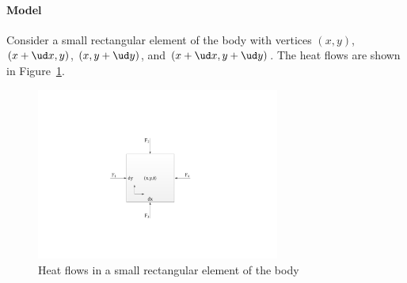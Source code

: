 \paragraph{Model}
Consider a small rectangular element of the body with vertices $(x,y)$, $(x+\ud x,y)$, $(x, y+\ud y)$, and $(x+\ud x, y+\ud y)$. The heat flows are shown in Figure~\ref{heatElement.fig}.
\begin{figure}[htb]
	\centering
	\includegraphics[width=8cm]{heatElement.pdf}       
	\caption{Heat flows in a small rectangular element of the body}\label{heatElement.fig}
\end{figure}

